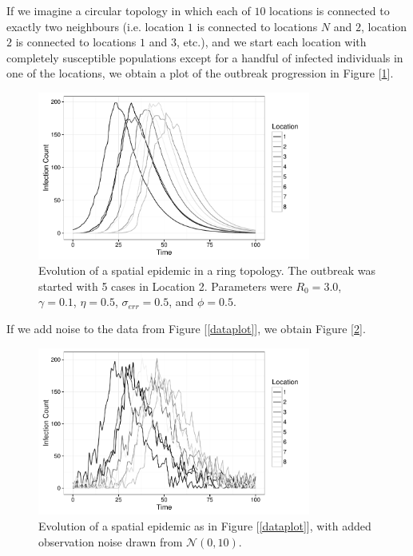 	If we imagine a circular topology in which each of $10$ locations is connected to exactly two neighbours (i.e. location $1$ is connected to locations $N$ and $2$, location $2$ is connected to locations $1$ and $3$, etc.), and we start each location with completely susceptible populations except for a handful of infected individuals in one of the locations, we obtain a plot of the outbreak progression in Figure [\ref{spatialdataplot}].

	\begin{figure}
        \centering
        \captionsetup{width=.8\linewidth}
        \includegraphics[width=0.8\textwidth]{./images/dataplot.pdf}
        \caption{Evolution of a spatial epidemic in a ring topology. The outbreak was started with 5 cases in Location 2. Parameters were $R_0 = 3.0$, $\gamma = 0.1$, $\eta = 0.5$, $\sigma_{err} = 0.5$, and $\phi = 0.5$. \label{spatialdataplot}}
    \end{figure}

    If we add noise to the data from Figure [\ref{dataplot}], we obtain Figure [\ref{spatialdataplot2}].

    \begin{figure}
        \centering
        \captionsetup{width=.8\linewidth}
        \includegraphics[width=0.8\textwidth]{./images/dataplot2.pdf}
        \caption{Evolution of a spatial epidemic as in Figure [\ref{dataplot}], with added observation noise drawn from $\mathcal{N}(0,10)$. \label{spatialdataplot2}}
    \end{figure}


